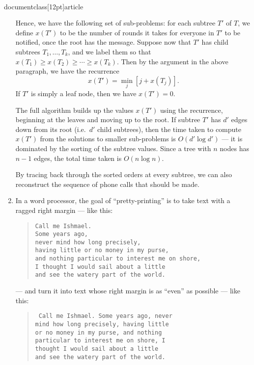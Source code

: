 \\documentclass[12pt]{article}
\begin{document}
\begin{enumerate}
{Hence, we have the following set of sub-problems:
for each subtree $T'$ of $T$, we define $x(T')$
to be the number of rounds it takes for everyone
in $T'$ to be notified, once the root has the message.
Suppose now that $T'$ has child subtrees
$T_1, \ldots, T_k$, and we label them so
that $x(T_1) \geq x(T_2) \geq \cdots \geq x(T_k)$.
Then by the argument in the above paragraph,
we have the recurrence
$$x(T') = \min_j \left[ j + x(T_j) \right].$$
If $T'$ is simply a leaf node, then we have $x(T') = 0$.

The full algorithm builds up the values $x(T')$
using the recurrence, beginning at the leaves 
and moving up to the root.
If subtree $T'$ has $d'$ edges down from its root
(i.e.~$d'$ child subtrees), then the time taken
to compute $x(T')$ from the solutions to smaller
sub-problems is $O(d' \log d')$ --- it is
dominated by the sorting of the subtree values.
Since a tree with $n$ nodes has $n-1$ edges,
the total time taken is $O(n \log n)$.

By tracing back through the sorted orders
at every subtree, we can also reconstruct
the sequence of phone calls that should be made.

}



\item

 In a word processor, the goal of ``pretty-printing''
is to take text with a ragged right margin --- like this:
\begin{quote}
{\tt Call me Ishmael. \\
Some years ago, \\
never mind how long precisely, \\
having little or no money in my purse, \\
and nothing particular to interest me on shore, \\
I thought I would sail about a little  \\
and see the watery part of the world.}
\end{quote}
--- and turn it into text whose right margin is
as ``even'' as possible --- like this:
\begin{quote}
{\tt
Call me Ishmael. Some years ago, never \\
mind how long precisely, having little \\
or no money in my purse, and nothing \\
particular to interest me on shore, I \\
thought I would sail about a little  \\
and see the watery part of the world.}
\end{quote}


\end{enumerate}
\end{document}
